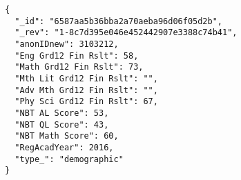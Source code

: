 \begin{table}[]
  \centering
  \label{demographic-data-csv}
  \caption{This table shows a variety of test scores used to benchmark incoming students to UCT. Included are certain Matric subject results (Eng, Math, Sci) as well as national benchmark test (NBT) scores}
\end{table}


\begin{verbatim}
{
  "_id": "6587aa5b36bba2a70aeba96d06f05d2b",
  "_rev": "1-8c7d395e046e452442907e3388c74b41",
  "anonIDnew": 3103212,
  "Eng Grd12 Fin Rslt": 58,
  "Math Grd12 Fin Rslt": 73,
  "Mth Lit Grd12 Fin Rslt": "",
  "Adv Mth Grd12 Fin Rslt": "",
  "Phy Sci Grd12 Fin Rslt": 67,
  "NBT AL Score": 53,
  "NBT QL Score": 43,
  "NBT Math Score": 60,
  "RegAcadYear": 2016,
  "type_": "demographic"
}
\end{verbatim}